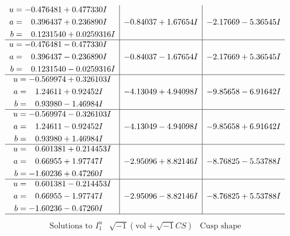\documentclass[1p]{elsarticle_modified}
\theoremstyle{definition}
\newcommand{\I}{\sqrt{-1}}
\begin{document}
$$\begin{array}{c|c|c}
\begin{aligned}
u &= -0.476481 + 0.477330 I \\
a &= \phantom{-}0.396437 + 0.236890 I \\
b &= \phantom{-}0.1231540 + 0.0259316 I\end{aligned}
 & -0.84037 + 1.67654 I & -2.17669 - 5.36545 I \\ \hline\begin{aligned}
u &= -0.476481 - 0.477330 I \\
a &= \phantom{-}0.396437 - 0.236890 I \\
b &= \phantom{-}0.1231540 - 0.0259316 I\end{aligned}
 & -0.84037 - 1.67654 I & -2.17669 + 5.36545 I \\ \hline\begin{aligned}
u &= -0.569974 + 0.326103 I \\
a &= \phantom{-}1.24611 + 0.92452 I \\
b &= \phantom{-}0.93980 - 1.46984 I\end{aligned}
 & -4.13049 + 4.94098 I & -9.85658 - 6.91642 I \\ \hline\begin{aligned}
u &= -0.569974 - 0.326103 I \\
a &= \phantom{-}1.24611 - 0.92452 I \\
b &= \phantom{-}0.93980 + 1.46984 I\end{aligned}
 & -4.13049 - 4.94098 I & -9.85658 + 6.91642 I \\ \hline\begin{aligned}
u &= \phantom{-}0.601381 + 0.214453 I \\
a &= \phantom{-}0.66955 + 1.97747 I \\
b &= -1.60236 + 0.47260 I\end{aligned}
 & -2.95096 + 8.82146 I & -8.76825 - 5.53788 I \\ \hline\begin{aligned}
u &= \phantom{-}0.601381 - 0.214453 I \\
a &= \phantom{-}0.66955 - 1.97747 I \\
b &= -1.60236 - 0.47260 I\end{aligned}
 & -2.95096 - 8.82146 I & -8.76825 + 5.53788 I\\
 \hline 
 \end{array}$$\newpage$$\begin{array}{c|c|c}  
\text{Solutions to }I^u_{1}& \I (\text{vol} + \sqrt{-1}CS) & \text{Cusp shape}\\
 \hline 
\begin{aligned}

\end{aligned}
\end{array}$$
\end{document}
